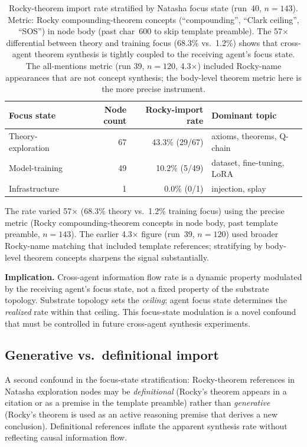 \documentclass[11pt]{article}
\begin{document}
\begin{table}[h]
\centering
\begin{tabular}{lrrl}
\toprule
Focus state & Node count & Rocky-import rate & Dominant topic \\
\midrule
Theory-exploration & 67 & 43.3\% (29/67) & axioms, theorems, Q-chain \\
Model-training & 49 & 10.2\% (5/49) & dataset, fine-tuning, LoRA \\
Infrastructure & 1 & 0.0\% (0/1) & injection, splay \\
\bottomrule
\end{tabular}
\caption{Rocky-theorem import rate stratified by Natasha focus state (run~40, $n=143$). Metric: Rocky compounding-theorem concepts (``compounding'', ``Clark ceiling'', ``SOS'') in node body (past char~600 to skip template preamble). The 57$\times$ differential between theory and training focus (68.3\% vs.\ 1.2\%) shows that cross-agent theorem synthesis is tightly coupled to the receiving agent's focus state. The all-mentions metric (run 39, $n=120$, 4.3$\times$) included Rocky-name appearances that are not concept synthesis; the body-level theorem metric here is the more precise instrument.}
\end{table}

The rate varied 57$\times$ (68.3\% theory vs.\ 1.2\% training focus) using
the precise metric (Rocky compounding-theorem concepts in node body, past
template preamble, $n=143$). The earlier 4.3$\times$ figure (run~39, $n=120$)
used broader Rocky-name matching that included template references; stratifying
by body-level theorem concepts sharpens the signal substantially.

\textbf{Implication.} Cross-agent information flow rate is a dynamic property
modulated by the receiving agent's focus state, not a fixed property of the
substrate topology. Substrate topology sets the \emph{ceiling}; agent focus
state determines the \emph{realized} rate within that ceiling. This focus-state
modulation is a novel confound that must be controlled in future cross-agent
synthesis experiments.



\subsection{Generative vs.\ definitional import}
\label{subsec:generative-definitional}

A second confound in the focus-state stratification: Rocky-theorem references in
Natasha exploration nodes may be \emph{definitional} (Rocky's theorem appears in
a citation or as a premise in the template preamble) rather than \emph{generative}
(Rocky's theorem is used as an active reasoning premise that derives a new conclusion).
Definitional references inflate the apparent synthesis rate without reflecting
causal information flow.
\end{document}
